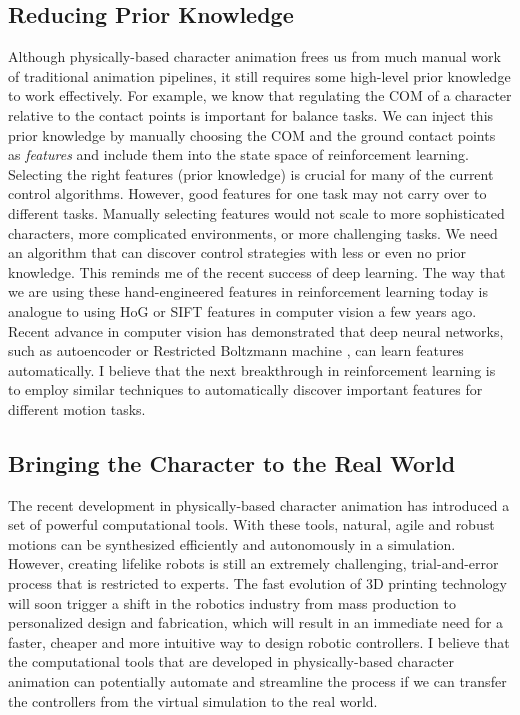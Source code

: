 \subsection{Reducing Prior Knowledge}

Although physically-based character animation frees us from much manual work of traditional animation pipelines, it still requires some high-level prior knowledge to work effectively. For example, we know that regulating the COM of a character relative to the contact points is important for balance tasks. We can inject this prior knowledge by manually choosing the COM and the ground contact points as \emph{features} and include them into the state space of reinforcement learning. Selecting the right features (prior knowledge) is crucial for many of the current control algorithms. However, good features for one task may not carry over to different tasks. Manually selecting features would not scale to more sophisticated characters, more complicated environments, or more challenging tasks. We need an algorithm that can discover control strategies with less or even no prior knowledge. This reminds me of the recent success of deep learning. The way that we are using these hand-engineered features in reinforcement learning today is analogue to using HoG or SIFT features in computer vision a few years ago. Recent advance in computer vision has demonstrated that deep neural networks, such as autoencoder \cite{Vincent:2008} or Restricted Boltzmann machine \cite{Hinton:2012}, can learn features automatically. I believe that the next breakthrough in reinforcement learning is to employ similar techniques to automatically discover important features for different motion tasks.

\subsection{Bringing the Character to the Real World}

The recent development in physically-based character animation has introduced a set of powerful computational tools. With these tools, natural, agile and robust motions can be synthesized efficiently and autonomously in a simulation. However, creating lifelike robots is still an extremely challenging, trial-and-error process that is restricted to experts. The fast evolution of 3D printing technology will soon trigger a shift in the robotics industry from mass production to personalized design and fabrication, which will result in an immediate need for a faster, cheaper and more intuitive way to design robotic controllers. I believe that the computational tools that are developed in physically-based character animation can potentially automate and streamline the process if we can transfer the controllers from the virtual simulation to the real world. 

